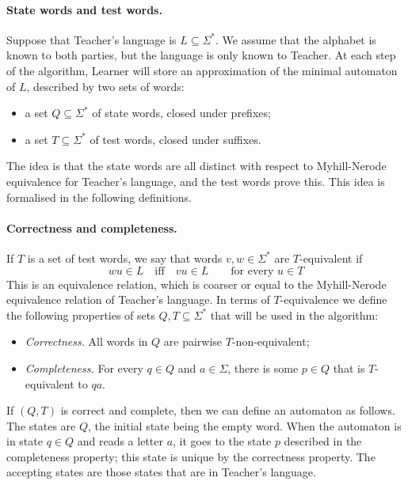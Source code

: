\paragraph*{State words and test words.}
Suppose that Teacher's language is $L \subseteq \Sigma^*$. We assume that the alphabet is known to both parties, but the language is only known to Teacher. At each step of the algorithm, Learner will store an approximation of the minimal automaton of $L$,  described by two sets of words:
\begin{itemize}
	\item a set $Q \subseteq \Sigma^*$ of state words, closed under prefixes;
	\item a set $T \subseteq \Sigma^*$ of test words, closed under suffixes.
\end{itemize}
The idea is that the state words are all distinct with respect to Myhill-Nerode equivalence for Teacher's language, and the test words  prove this. This idea is formalised in the following definitions.

\paragraph*{Correctness and completeness.} If $T$ is a set of test words, we say that words $v,w \in \Sigma^*$ are $T$-equivalent if $$ wu \in L \quad\mbox{iff}  \quad vu \in L  \qquad \mbox{for every $u \in T$}$$ This is an equivalence relation, which is coarser or equal to the Myhill-Nerode equivalence relation of Teacher's language. In terms of $T$-equivalence we define the following properties of sets $Q,T \subseteq \Sigma^*$ that will be used in the algorithm:
\begin{itemize}
	\item \emph{Correctness.} All words in $Q$ are pairwise $T$-non-equivalent;
	\item \emph{Completeness.} For every $q \in Q$ and $a \in \Sigma$, there is some $p \in Q$ that is $T$-equivalent to $qa$.
\end{itemize}



If $(Q,T)$ is correct and complete, then we can define an automaton as follows. The states are $Q$, the initial state being the empty word. When the automaton is in state $q \in Q$ and reads a letter $a$, it goes to the state $p$ described in the completeness property; this state is unique by the correctness property. The accepting states are those states that are in Teacher's language.


